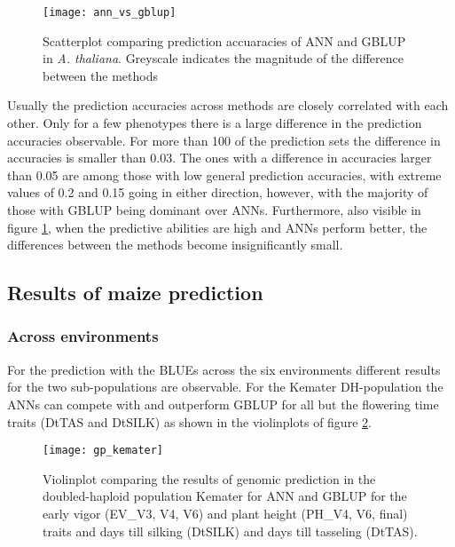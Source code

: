 \begin{figure}[H]
  \centering
  \texttt{[image: ann\_vs\_gblup]}
  \decoRule
  \caption[Scatterplot comparing prediction accuaracies of ANN and GBLUP in
  \textit{A. thaliana}]{Scatterplot comparing prediction accuaracies of ANN and GBLUP in
    \textit{A. thaliana}. Greyscale indicates the magnitude of the difference between the
    methods}
\label{fig:annblup}
\end{figure}

Usually the prediction accuracies across methods are closely correlated with each other.
Only for a few phenotypes there is a large difference in the prediction accuracies
observable. For more than 100 of the prediction sets the difference in accuracies is
smaller than 0.03. The ones with a difference in accuracies larger than 0.05 are among
those with low general prediction accuracies, with extreme values of 0.2 and 0.15 going in
either direction, however, with the majority of those with GBLUP being dominant over
ANNs. Furthermore, also visible in figure \ref{fig:annblup}, when the predictive abilities
are high and ANNs perform better, the differences between the methods become
insignificantly small.

\subsection{Results of maize prediction}
\subsubsection{Across environments}

For the prediction with the BLUEs across the six environments different results for the
two sub-populations are observable.  For the Kemater DH-population the ANNs can compete
with and outperform GBLUP for all but the flowering time traits (DtTAS and DtSILK) as
shown in the violinplots of figure \ref{fig:ke_ann}.

\begin{figure}[H]
 \centering \texttt{[image: gp\_kemater]}
 \decoRule
 \caption[Violinplot comparing the results for GP in the DH population Kemater for ANN and
 GBLUP]{Violinplot comparing the results of genomic prediction in the doubled-haploid
   population Kemater for ANN and GBLUP for the early vigor (EV\_V3, V4, V6) and plant height
   (PH\_V4, V6, final) traits and days till silking (DtSILK) and days till tasseling (DtTAS). }
\label{fig:ke_ann}
\end{figure}

